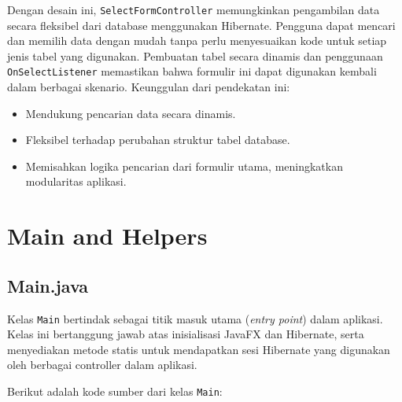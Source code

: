 Dengan desain ini, \texttt{SelectFormController} memungkinkan pengambilan data secara fleksibel dari database menggunakan Hibernate. Pengguna dapat mencari dan memilih data dengan mudah tanpa perlu menyesuaikan kode untuk setiap jenis tabel yang digunakan. Pembuatan tabel secara dinamis dan penggunaan \texttt{OnSelectListener} memastikan bahwa formulir ini dapat digunakan kembali dalam berbagai skenario. Keunggulan dari pendekatan ini:
\begin{itemize}
	\item Mendukung pencarian data secara dinamis.
	\item Fleksibel terhadap perubahan struktur tabel database.
	\item Memisahkan logika pencarian dari formulir utama, meningkatkan modularitas aplikasi.
\end{itemize}


\section{Main and Helpers}

\subsection{Main.java}

Kelas \texttt{Main} bertindak sebagai titik masuk utama (\textit{entry point}) dalam aplikasi. Kelas ini bertanggung jawab atas inisialisasi JavaFX dan Hibernate, serta menyediakan metode statis untuk mendapatkan sesi Hibernate yang digunakan oleh berbagai controller dalam aplikasi.

Berikut adalah kode sumber dari kelas \texttt{Main}:

